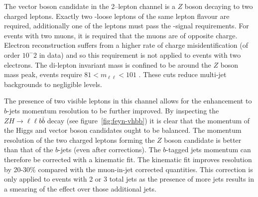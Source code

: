 The vector boson candidate in the 2--lepton channel is a $Z$ boson decaying to
two charged leptons. Exactly two \VH-loose leptons of the same lepton flavour
are required, additionally one of the leptons must pass the \ZH-signal
requirements. For events with two muons, it is required that the muons are of
opposite charge. Electron reconstruction suffers from a higher rate of charge
misidentification (of order $10^-2$ in data) and so this requirement is not
applied to events with two electrons. The di-lepton invariant mass is confined
to be around the $Z$ boson mass peak, events require $81 < m_{\ell\ell} < 101$
\GeV. These cuts reduce multi-jet backgrounds to negligible levels.

The presence of two visible leptons in this channel allows for the enhancement
to $b$-jets momentum resolution to be further improved. By inspecting the $Z\!H\!
\to\! \ell\ell b\bar{b}$ decay (see figure~\ref{fig:feyn-vhbb}) it is clear that
the momentum of the Higgs and vector boson candidates ought to be balanced. The
momentum resolution of the two charged leptons forming the $Z$ boson candidate
is better than that of the $b$-jets (even after corrections). The $b$-tagged
jets momentum can therefore be corrected with a kinematic fit. The kinematic fit
improves resolution by 20-30\% compared with the muon-in-jet corrected
quantities. This correction is only applied to events with 2 or 3 total jets as
the presence of more jets results in a smearing of the effect over those
additional jets.
